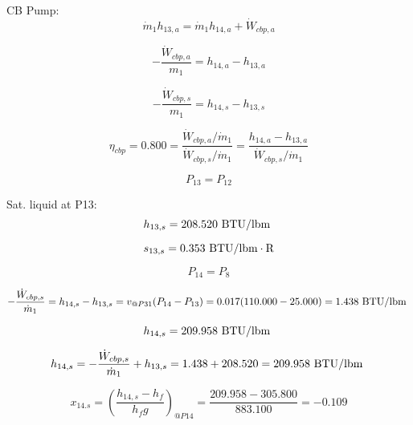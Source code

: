 \documentclass{article}
\begin{document}
CB Pump:
\begin{equation}
\dot{m}_{ 1}h_{13,a} = \dot{m}_{ 1}h_{14,a} + \dot{W}_{cbp,a}
\end{equation}

\begin{equation}
-\frac{\dot{W}_{cbp,a}}{m_1} = h_{14,a} - h_{13,a}\end{equation}

\begin{equation}
-\frac{\dot{W}_{cbp,s}}{m_1} = h_{14,s} - h_{13,s}\end{equation}

\begin{equation}
\eta_{cbp} =    0.800 = \frac{\dot{W}_{cbp,a} / \dot{m}_{1}}{\dot{W}_{cbp,s} / \dot{m}_{1}} = \frac{
h_{14,a} - h_{13,a}}{\dot{W}_{cbp,s} / \dot{m}_{1}}
\end{equation}

\begin{equation}
P_{13} = P_{12}
\end{equation}

Sat. liquid at P13:
\begin{equation}
  h_{13,s} =  208.520\textnormal{ BTU/lbm                   }
\end{equation}

\begin{equation}
  s_{13,s} =    0.353\textnormal{ BTU/lbm}\cdot\textnormal{R}
\end{equation}

\begin{equation}
P_{14} = P_{ 8}
\end{equation}

\begin{equation}
-\frac{\dot{W}_{cbp,s}}{\dot{m}_{ 1}} = h_{14,s} - h_{13,s} = v_{@P31}(P_{14} - P_{13}) =    0.017( 110.000 -   25.000) =    1.438\textnormal{ BTU/lbm                   }
\end{equation}

\begin{equation}
  h_{14,s} =  209.958\textnormal{ BTU/lbm                   }
\end{equation}

\begin{equation}
h_{14,s} = -\frac{\dot{W}_{cbp,s}}{\dot{m}_{1}} + h_{13,s} =    1.438 +  208.520 =  209.958\textnormal{ BTU/lbm                   }
\end{equation}

\begin{equation}
x_{14.s} = (\frac{h_{14,s} - h_{f}}{h_fg})_{@P14} = \frac{ 209.958 -  305.800}{ 883.100} =   -0.109
\end{equation}
\end{document}
